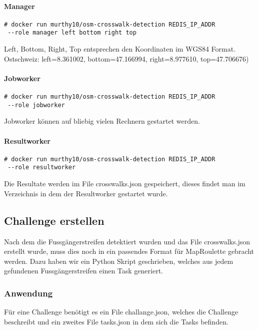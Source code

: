 \paragraph{Manager}
\begin{lstlisting}[style=BashInputStyle]
 # docker run murthy10/osm-crosswalk-detection REDIS_IP_ADDR 
 --role manager left bottom right top
\end{lstlisting}
Left, Bottom, Right, Top entsprechen den Koordinaten im WGS84 Format. \\
Ostschweiz: left=8.361002, bottom=47.166994, right=8.977610, top=47.706676) 

\paragraph{Jobworker}
\begin{lstlisting}[style=BashInputStyle]
 # docker run murthy10/osm-crosswalk-detection REDIS_IP_ADDR 
 --role jobworker
\end{lstlisting}
Jobworker können auf bliebig vielen Rechnern gestartet werden.\\

\paragraph{Resultworker}
\begin{lstlisting}[style=BashInputStyle]
 # docker run murthy10/osm-crosswalk-detection REDIS_IP_ADDR 
 --role resultworker
\end{lstlisting}
Die Resultate werden im File crosswalks.json gespeichert, dieses findet man im Verzeichnis in dem der Resultworker gestartet wurde.
\newpage

\subsection{Challenge erstellen}
Nach dem die Fussgängerstreifen detektiert wurden und das File crosswalks.json erstellt wurde, muss dies noch in ein passendes Format für MapRoulette gebracht werden. Dazu haben wir ein Python Skript geschrieben, welches aus jedem gefundenen Fussgängerstreifen einen Task generiert.

\subsubsection{Anwendung}
Für eine Challenge benötigt es ein File challange.json, welches die Challenge beschreibt und ein zweites File tasks.json in dem sich die Tasks befinden.\\

